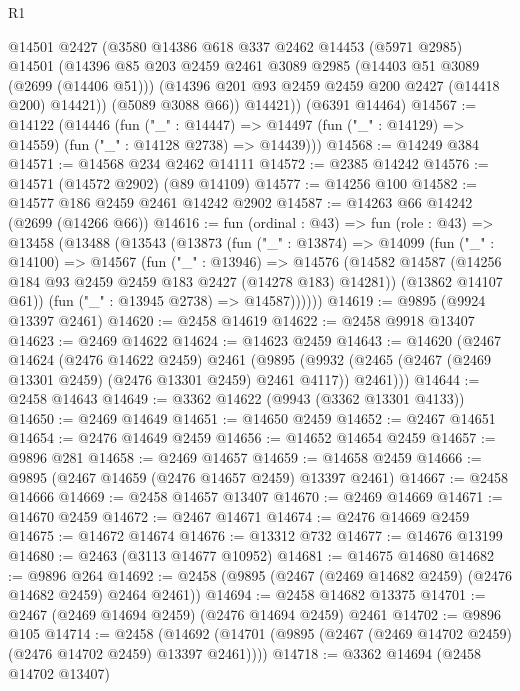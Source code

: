 \begin{lexlean}{R1}
\begin{coremodule}
        @14501
        @2427
        (@3580
          @14386
          @618
          @337
          @2462
          @14453
          (@5971 @2985)
          @14501
          (@14396
            @85
            @203
            @2459
            @2461
            @3089
            @2985
            (@14403 @51 @3089 (@2699 (@14406 @51)))
            (@14396 @201 @93 @2459 @2459 @200 @2427 (@14418 @200) @14421))
          (@5089 @3088 @66))
        @14421))
    (@6391 @14464)
@14567 := @14122
    (@14446
      (fun ("_" : @14447) =>
      @14497 (fun ("_" : @14129) => @14559) (fun ("_" : @14128 @2738) => @14439)))
@14568 := @14249 @384
@14571 := @14568 @234 @2462 @14111
@14572 := @2385 @14242
@14576 := @14571 (@14572 @2902) (@89 @14109)
@14577 := @14256 @100
@14582 := @14577 @186 @2459 @2461 @14242 @2902
@14587 := @14263 @66 @14242 (@2699 (@14266 @66))
@14616 := fun (ordinal : @43) =>
  fun (role : @43) =>
  @13458
    (@13488
      (@13543
        (@13873
          (fun ("_" : @13874) =>
          @14099
            (fun ("_" : @14100) =>
            @14567
              (fun ("_" : @13946) =>
              @14576
                (@14582 @14587 (@14256 @184 @93 @2459 @2459 @183 @2427 (@14278 @183) @14281))
                (@13862 @14107 @61))
              (fun ("_" : @13945 @2738) => @14587))))))
@14619 := @9895 (@9924 @13397 @2461)
@14620 := @2458 @14619
@14622 := @2458 @9918 @13407
@14623 := @2469 @14622
@14624 := @14623 @2459
@14643 := @14620
    (@2467
      @14624
      (@2476 @14622 @2459)
      @2461
      (@9895 (@9932 (@2465 (@2467 (@2469 @13301 @2459) (@2476 @13301 @2459) @2461 @4117)) @2461)))
@14644 := @2458 @14643
@14649 := @3362 @14622 (@9943 (@3362 @13301 @4133))
@14650 := @2469 @14649
@14651 := @14650 @2459
@14652 := @2467 @14651
@14654 := @2476 @14649 @2459
@14656 := @14652 @14654 @2459
@14657 := @9896 @281
@14658 := @2469 @14657
@14659 := @14658 @2459
@14666 := @9895 (@2467 @14659 (@2476 @14657 @2459) @13397 @2461)
@14667 := @2458 @14666
@14669 := @2458 @14657 @13407
@14670 := @2469 @14669
@14671 := @14670 @2459
@14672 := @2467 @14671
@14674 := @2476 @14669 @2459
@14675 := @14672 @14674
@14676 := @13312 @732
@14677 := @14676 @13199
@14680 := @2463 (@3113 @14677 @10952)
@14681 := @14675 @14680
@14682 := @9896 @264
@14692 := @2458 (@9895 (@2467 (@2469 @14682 @2459) (@2476 @14682 @2459) @2464 @2461))
@14694 := @2458 @14682 @13375
@14701 := @2467 (@2469 @14694 @2459) (@2476 @14694 @2459) @2461
@14702 := @9896 @105
@14714 := @2458
    (@14692 (@14701 (@9895 (@2467 (@2469 @14702 @2459) (@2476 @14702 @2459) @13397 @2461))))
@14718 := @3362 @14694 (@2458 @14702 @13407)

\end{coremodule}
\end{lexlean}
